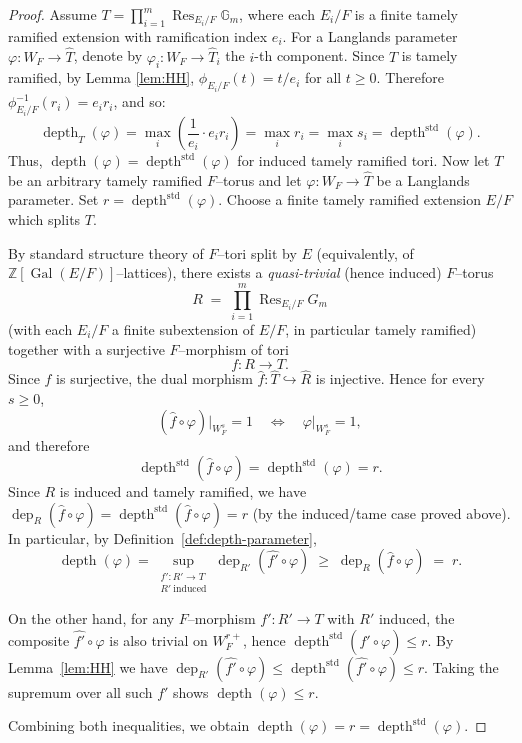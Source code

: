 \documentclass[american]{article}
\newcommand{\depthstd}{\operatorname{depth}^{\mathrm{std}}}
\numberwithin{equation}{section}
\numberwithin{figure}{section}
\theoremstyle{plain}
\theoremstyle{definition}
\theoremstyle{remark}
\DeclareMathOperator{\depth}{depth}
\DeclareMathOperator{\dep}{dep}
\DeclareMathOperator{\Gal}{Gal}
\DeclareMathOperator{\Res}{Res}
\newcommand{\G}{G}
\newcommand{\Z}{\mathbb{Z}}
\begin{document}
\begin{proof}
Assume \(T = \prod_{i=1}^{m} \operatorname{Res}_{E_i/F} \mathbb{G}_m\), where each \(E_i/F\) is a finite tamely ramified extension with ramification index \(e_i\). For a Langlands parameter \(\varphi: W_F \to \widehat{T}\), denote by \(\varphi_i: W_F \to \widehat{T}_i\) the \(i\)-th component.
Since \(T\) is  tamely ramified,  by Lemma \ref{lem:HH},  \(\phi_{E_i/F}(t) = t / e_i\) for all \(t \geq 0\). 
Therefore  \(\phi_{E_i/F}^{-1}(r_i) = e_i r_i\), and so:
\[
\operatorname{depth}_T(\varphi) = \max_i \left( \frac{1}{e_i} \cdot e_i r_i \right) = \max_i r_i = \max_i s_i = \operatorname{depth}^{\text{std}}(\varphi).
\]
Thus, \(\operatorname{depth}(\varphi) = \operatorname{depth}^{\text{std}}(\varphi)\) for induced tamely ramified tori.
Now let $T$ be an arbitrary tamely ramified $F$--torus and let $\varphi:W_F\to \widehat T$
be a Langlands parameter. Set $r=\depthstd(\varphi)$.
Choose a finite tamely ramified extension $E/F$ which splits $T$.

By standard structure theory of $F$--tori split by $E$ (equivalently, of $\Z[\Gal(E/F)]$--lattices),
there exists a \emph{quasi-trivial} (hence induced) $F$--torus
\[
R \;=\; \prod_{i=1}^m \Res_{E_i/F}\G_m
\]
(with each $E_i/F$ a finite subextension of $E/F$, in particular tamely ramified) together with a
surjective $F$--morphism of tori
\[
f:R\longrightarrow T.
\]
Since $f$ is surjective, the dual morphism $\widehat f:\widehat T\hookrightarrow \widehat R$
is injective. Hence for every $s\ge 0$,
\[
(\widehat f\circ \varphi)\vert_{W_F^{s}}=1 \quad\Longleftrightarrow\quad
\varphi\vert_{W_F^{s}}=1,
\]
and therefore
\[
\depthstd(\widehat f\circ \varphi)=\depthstd(\varphi)=r.
\]
Since $R$ is induced and tamely ramified, we have
$\dep_R(\widehat f\circ \varphi)=\depthstd(\widehat f\circ \varphi)=r$
(by the induced/tame case proved above). In particular, by Definition~\ref{def:depth-parameter},
\[
\depth(\varphi)
=\sup_{\substack{f':R'\to T\\ R'\ \mathrm{induced}}}\dep_{R'}(\widehat{f'}\circ\varphi)
\;\ge\; \dep_R(\widehat f\circ\varphi)\;=\; r.
\]

On the other hand, for any $F$--morphism $f':R'\to T$ with $R'$ induced, the composite
$\widehat{f'}\circ\varphi$ is also trivial on $W_F^{r+}$, hence
$\depthstd(\widehat{f'}\circ\varphi)\le r$. By Lemma~\ref{lem:HH} we have
$\dep_{R'}(\widehat{f'}\circ\varphi)\le \depthstd(\widehat{f'}\circ\varphi)\le r$.
Taking the supremum over all such $f'$ shows $\depth(\varphi)\le r$.

Combining both inequalities, we obtain $\depth(\varphi)=r=\depthstd(\varphi)$.

\end{proof}
\end{document}
